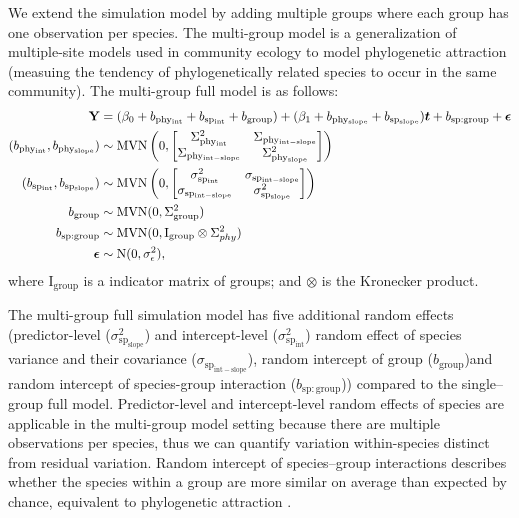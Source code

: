 \documentclass[12pt]{article}
\begin{document}
We extend the simulation model by adding multiple groups where each group has one observation per species. 
The multi-group model is a generalization of multiple-site models used in community ecology to model phylogenetic attraction (measuing the tendency of phylogenetically related species to occur in the same community). 
The multi-group full model is as follows: 
\begin{equation}
\begin{aligned}
{\mathbf Y} & = (\beta_0 + b_{\mathrm{phy_{int}}} + b_{\mathrm{sp_{int}}} + b_{\mathrm{group}}) + (\beta_1 + b_{\mathrm{phy_{slope}}} + b_{\mathrm{sp_{slope}}}) \bm{t} + b_{\mathrm{sp:group}} + {\boldsymbol \epsilon} \\
(b_{\mathrm{phy_{int}}}, b_{\mathrm{phy_{slope}}}) & \sim \textrm{MVN} \left( 0, \begin{bmatrix}
\Sigma^2_{\mathrm{phy_{int}}} & \Sigma_{\mathrm{phy_{int-slope}}} \\ 
\Sigma_{\mathrm{phy_{int-slope}}} & \Sigma^2_{\mathrm{phy_{slope}}}
\end{bmatrix}
\right) \\
(b_{\mathrm{sp_{int}}}, b_{\mathrm{sp_{slope}}}) & \sim \textrm{MVN} \left( 0, \begin{bmatrix}
\sigma^2_{\mathrm{sp_{int}}} & \sigma_{\mathrm{sp_{int-slope}}} \\ 
\sigma_{\mathrm{sp_{int-slope}}} & \sigma^2_{\mathrm{sp_{slope}}}
\end{bmatrix}
\right) \\
b_{\mathrm{group}} & \sim \textrm{MVN} ( 0 , \Sigma^2_{\mathrm{group}}) \\
b_{\mathrm{sp:group}} & \sim \textrm{MVN} (0, \mathrm{I}_{\mathrm{group}} \otimes \Sigma^2_{phy}) \\
{\boldsymbol \epsilon} & \sim \textrm{N} ( 0 , \sigma_{\epsilon}^2),
\label{eq:multiple_glmm}
\end{aligned}
\end{equation}
where $\textrm{I}_{\textrm{group}}$ is a indicator matrix of groups; and $\otimes$ is the Kronecker product.

The multi-group full simulation model has five additional random effects (predictor-level ($\sigma^2_{\mathrm{sp_{slope}}}$) and intercept-level ($\sigma^2_{\mathrm{sp_{int}}}$) random effect of species variance and their covariance ($\sigma_{\mathrm{sp_{int-slope}}}$), random intercept of group ($b_{\mathrm{group}}$)and random intercept of species-group interaction ($b_{\mathrm{sp:group}}$)) compared to the single--group full model.
Predictor-level and intercept-level random effects of species are applicable in the multi-group model setting because there are multiple observations per species, thus we can quantify variation within-species distinct from residual variation.
Random intercept of species--group interactions describes whether the species within a group are more similar on average than expected by chance, equivalent to phylogenetic attraction \citep{helmus2007separating}. 
\end{document}
